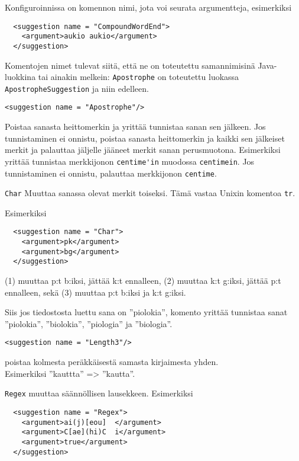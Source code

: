 \documentclass[12pt,a4paper]{scrartcl}
\begin{document}


Konfiguroinnissa on komennon nimi, jota voi seurata argumentteja,
esimerkiksi

\begin{verbatim}
  <suggestion name = "CompoundWordEnd">
    <argument>aukio aukio</argument>
  </suggestion>
\end{verbatim}


Komentojen nimet tulevat siitä,
että ne on toteutettu samannimisinä Java-luokkina tai ainakin melkein:
\verb|Apostrophe| on toteutettu luokassa \verb|ApostropheSuggestion|
ja niin edelleen.


\bigskip
\verb|<suggestion name = "Apostrophe"/>|

Poistaa sanasta heittomerkin ja yrittää tunnistaa sanan sen jälkeen.
Jos tunnistaminen ei onnistu, poistaa sanasta heittomerkin ja kaikki
sen jälkeiset merkit ja palauttaa jäljelle jääneet merkit sanan
perusmuotona. Esimerkiksi yrittää tunnistaa merkkijonon
\verb|centime'in| muodossa \verb|centimein|. Jos tunnistaminen ei
onnistu, palauttaa merkkijonon \verb|centime|.



\bigskip
\verb|Char| Muuttaa sanassa olevat merkit toiseksi. Tämä vastaa Unixin komentoa \verb|tr|.

Esimerkiksi

\begin{verbatim}
  <suggestion name = "Char">
    <argument>pk</argument>
    <argument>bg</argument>
  </suggestion>
\end{verbatim}

(1) muuttaa p:t b:iksi, jättää k:t ennalleen,
(2) muuttaa k:t g:iksi, jättää p:t ennalleen, sekä
(3) muuttaa p:t b:iksi ja k:t g:iksi.

Siis jos tiedostosta luettu sana on ''piolokia'', komento yrittää
tunnistaa sanat ''piolokia'', ''biolokia'', ''piologia'' ja ''biologia''.


\bigskip
\verb|<suggestion name = "Length3"/>|

poistaa kolmesta peräkkäisestä samasta kirjaimesta
yhden. \\ Esimerkiksi ''kauttta'' => ''kautta''.


\bigskip

\verb|Regex| muuttaa säännöllisen lausekkeen. Esimerkiksi


\begin{verbatim}
  <suggestion name = "Regex">
    <argument>ai(j)[eou]  </argument>
    <argument>C[ae](hi)C  i</argument> 
    <argument>true</argument>
  </suggestion>
\end{verbatim}
\end{document}
